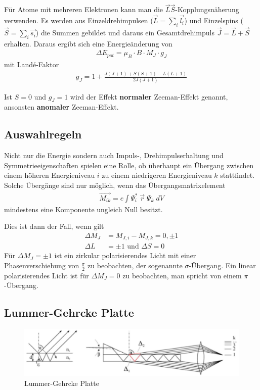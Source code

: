     Für Atome mit mehreren Elektronen kann man die $\vec{L} \vec{S}$-Kopplungsnäherung verwenden. Es werden aus Einzeldrehimpulsen ($\vec{L} = \sum_i \vec{l_i}$) und Einzelspins ($\vec{S} = \sum_i \vec{s_i}$) die Summen gebildet und daraus ein Gesamtdrehimpuls $\vec{J} = \vec{L} + \vec{S}$ erhalten. Daraus ergibt sich eine Energieänderung von
    \begin{align}
    	\Delta E_{pot} = \mu_B \cdot B \cdot M_J \cdot g_J
    \end{align}
    mit Landé-Faktor
    \begin{align}
    	g_J = 1 + \frac{J(J + 1) + S(S + 1) - L(L + 1)}{2J(J + 1)}
    \end{align}

    Ist $S = 0$ und $g_J = 1$ wird der Effekt \textbf{normaler} Zeeman-Effekt genannt, ansonsten \textbf{anomaler} Zeeman-Effekt.

  \subsection{Auswahlregeln}
    Nicht nur die Energie sondern auch Impuls-, Drehimpulserhaltung und Symmetrieeigenschaften spielen eine Rolle, ob überhaupt ein Übergang zwischen einem höheren Energieniveau $i$ zu einem niedrigeren Energieniveau $k$ stattfindet. Solche Übergänge sind nur möglich, wenn das Übergangsmatrixelement
    \begin{align}
    	\vec{M_{ik}} = e \int \Psi_i^* \; \vec{r} \; \Psi_k \; dV
    \end{align}
    mindestens eine Komponente ungleich Null besitzt.

    Dies ist dann der Fall, wenn gilt
    \begin{align*}
      \Delta M_J &= M_{J,i} - M_{J,k} = 0, \pm 1\\
      \Delta L &= \pm 1 \text{ und } \Delta S = 0
    \end{align*}
    Für $\Delta M_J = \pm 1$ ist ein zirkular polarisierendes Licht mit einer Phasenverschiebung von $\frac{\pi}{2}$ zu beobachten, der sogenannte $\sigma$-Übergang. Ein linear polarisierendes Licht ist für $\Delta M_J = 0$ zu beobachten, man spricht von einem $\pi$-Übergang.

  \subsection{Lummer-Gehrcke Platte}
    \begin{figure}[H]
    	\centering
    	\includegraphics[scale=0.5]{parts/lummerGehrckePlate}
    	\caption{Lummer-Gehrcke Platte \cite{fp.booklet}}\label{fig:lummerGehrckePlatte}
    \end{figure}

